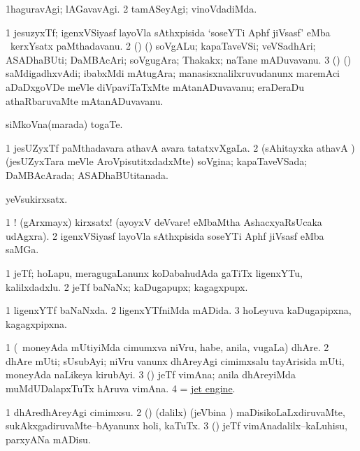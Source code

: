 \bentry
{}
\gl{\kirxvi}
\bmng
\bnum
\num{1}haguravAgi; lAGavavAgi. 
\num{2} tamASeyAgi; vinoVdadiMda. 
\enum
\emng
\eentry

\bentry
{}
\gl{\nA}
\bmng
\bnum
\num{1} jesuzyxTf; igenxVSiyasf layoVla sAthxpisida `soseYTi Aphf jiVsasf' eMba \roVkAyx\ kerxYsatx paMthadavanu. 
\num{2} (\hiV) (\pArxparx) soVgALu; kapaTaveVSi; veVSadhAri; ASADhaBUti; DaMBAcAri; soVgugAra; Thakakx; naTane mADuvavanu. 
\num{3} (\ca) (\hiV) saMdigadhxvAdi; ibabxMdi mAtugAra; manasisxnalilxruvudanunx maremAci aDaDxgoVDe meVle diVpaviTaTxMte mAtanADuvavanu; eraDeraDu athaRbaruvaMte mAtanADuvavanu. 
\enum
\emng

\noindent
\gl{\pagu}
\bmng
{} siMkoVna(marada) togaTe. 
\emng
\eentry

\bentry
{}
\gl{\gu}
\bmng
\bnum
\num{1} jesUZyxTf paMthadavara athavA avara tatatxvXgaLa. 
\num{2} (sAhitayxka athavA \hiV) (jesUZyxTara meVle AroVpisutitxdadxMte) soVgina; kapaTaveVSada; DaMBAcArada; ASADhaBUtitanada. 
\enum
\emng
\eentry

\bentry
{}
\gl{\nA}
\bmng
yeVsukirxsatx. 
\emng

\noindent
\gl{\pagu}
\bmng
\bnum
\num{1} ! (gArxmayx) kirxsatx! (ayoyxV deVvare! eMbaMtha AshacxyaRsUcaka udAgxra). 
\num{2}  igenxVSiyasf layoVla sAthxpisida soseYTi Aphf jiVsasf eMba saMGa. 
\enum
\emng
\eentry

\bentry
{}
\gl{\nA}
\bmng
\bnum
\num{1} jeTf; hoLapu, meragugaLanunx koDabahudAda gaTiTx ligenxYTu, kalilxdadxlu. 
\hypertarget{jet(1)2}{} 
\num{2} jeTf baNaNx; kaDugapupx; kagagxpupx. 
\enum
\emng
\eentry

\bentry
{}
\gl{\gu}
\bmng
\bnum
\num{1} ligenxYTf baNaNxda. 
\num{2} ligenxYTfniMda mADida. 
\hypertarget{jet(2)3}{} 
\num{3} hoLeyuva kaDugapipxna, kagagxpipxna. 
\enum
\emng
\eentry

\bentry
{}
\gl{\nA}
\bmng
\bnum
\num{1} (\kanmu\ moneyAda mUtiyiMda cimumxva niVru, habe, anila, \mo vugaLa) dhAre. 
\num{2} dhAre mUti; sUsubAyi; niVru \mo vanunx dhAreyAgi cimimxsalu tayArisida mUti, moneyAda naLikeya kirubAyi. 
\num{3} (\AmA) jeTf vimAna; anila dhAreyiMda muMdUDalapxTuTx hAruva vimAna. 
\num{4}  = \hyperlink{jet engine}{jet engine}. 
\enum
\emng
\eentry

\bentry
{}
\gl{\sakirx}
\bmng
\bnum
\num{1} dhAredhAreyAgi cimimxsu. 
\num{2} (\birx) (\BUkaq dalilx) (jeVbina \vi) maDisikoLaLxdiruvaMte, sukAkxgadiruvaMte--bAyanunx holi, kaTuTx. 
\num{3} (\AmA) jeTf vimAnadalilx--kaLuhisu, parxyANa mADisu. 
\enum
\emng

